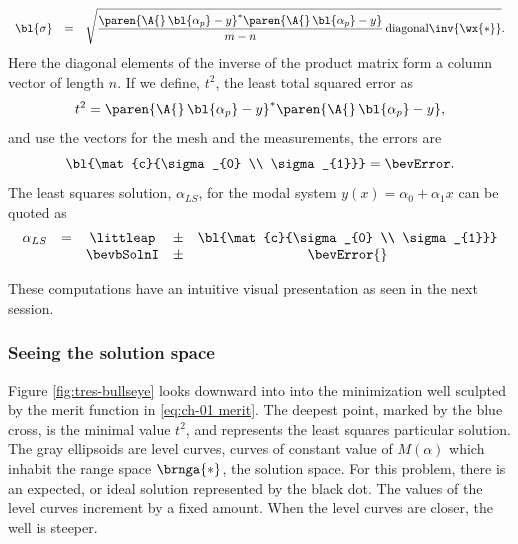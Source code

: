 %
\begin{equation}
	\begin{array}{cccc}
	\bl{\sigma} &=& 
	\displaystyle{ \sqrt {
		\frac{
		\paren{\A{} \, \bl{\alpha_{p}}-y}^{*} \paren{\A{} \, \bl{\alpha_{p}}-y}} {m-n}
		\,\text{diagonal}\inv{ \wx{*} }
	}}.
	\end{array}
\label{eq:bevington error}
\end{equation}
%
Here the diagonal elements of the inverse of the product matrix form a column vector of length $n$.
%
If we define, $t^{2}$, the least total squared error as
%
\begin{equation}
	t^{2} = \paren{\A{}\, \bl{\alpha_{p}}-y}^{*} \paren{\A{} \, \bl{\alpha_{p}}-y},
\label{eq:t2r}
\end{equation}
%
and use the vectors for the mesh and the measurements, the errors are
%
\begin{equation}
	\bl{\mat{c}{\sigma_{0} \\ \sigma_{1}}} = 
	\bevError.
\label{eq:bevington error again}
\end{equation}
%
The least squares solution, $\alpha_{LS}$, for the modal system $y(x) = \alpha_{0} + \alpha_{1} x$ can be quoted as 
%
\begin{equation}
	\begin{array}{cccccc}
		\alpha_{LS} 
		&=& \littleap & \pm & \bl{\mat{c}{\sigma_{0} \\ \sigma_{1}}} \\
		 && \bevbSolnI
		& \pm &
	\bevError{}
	\end{array}
\label{eq:bevington final answer}
\end{equation}

These computations have an intuitive visual presentation as seen in the next session.

\subsubsection{\label{sec:Seeing the solution space}Seeing the solution space} 

Figure \ref{fig:tres-bullseye} looks downward into into the minimization well sculpted by the merit function in \eqref{eq:ch-01 merit}. The deepest point, marked by the blue cross, is the minimal value $t^{2}$, and represents the least squares particular solution. The gray ellipsoids are level curves, curves of constant value of $M(\alpha)$ which inhabit the range space $\brnga{*}$, the solution space. For this problem, there is an expected, or ideal solution represented by the black dot. The values of the level curves increment by a fixed amount. When the level curves are closer, the well is steeper.

